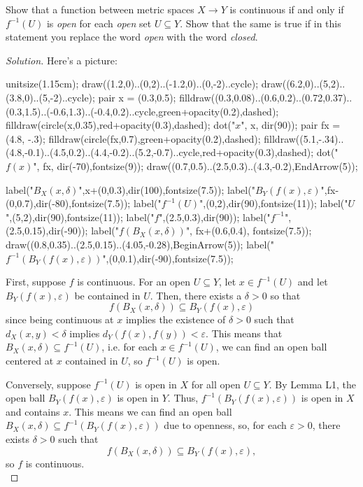 \documentclass[11pt]{scrartcl}
\providecommand{\eps}{\varepsilon}
\providecommand{\inv}{^{-1}}
\newenvironment{soln}{\begin{proof}[Solution]}{\end{proof}}
\begin{document}
\begin{problem}
	Show that a function between metric spaces $X\to Y$ is continuous
	if and only if $f\inv (U)$ is \emph{open}
	for each \emph{open} set $U\subseteq Y$.
	Show that the same is true if in this statement
	you replace the word \emph{open} with the word \emph{closed}.
\end{problem}

\begin{soln}
	Here's a picture:
	\begin{center}
		\begin{asy}
			unitsize(1.15cm);
			draw((1.2,0)..(0,2)..(-1.2,0)..(0,-2)..cycle);
			draw((6.2,0)..(5,2)..(3.8,0)..(5,-2)..cycle);
			pair x = (0.3,0.5);
			filldraw((0.3,0.08)..(0.6,0.2)..(0.72,0.37)..(0.3,1.5)..(-0.6,1.3)..(-0.4,0.2)..cycle,green+opacity(0.2),dashed);
			filldraw(circle(x,0.35),red+opacity(0.3),dashed);
			dot("$x$", x, dir(90));
			pair fx = (4.8, -.3);
			filldraw(circle(fx,0.7),green+opacity(0.2),dashed);
			filldraw((5.1,-.34)..(4.8,-0.1)..(4.5,0.2)..(4.4,-0.2)..(5.2,-0.7)..cycle,red+opacity(0.3),dashed);
			dot("$f(x)$", fx, dir(-70),fontsize(9));
			draw((0.7,0.5)..(2.5,0.3)..(4.3,-0.2),EndArrow(5));
			
			label("$B_X(x,\delta)$",x+(0,0.3),dir(100),fontsize(7.5));
			label("$B_Y(f(x),\varepsilon)$",fx-(0,0.7),dir(-80),fontsize(7.5));
			label("$f^{-1}(U)$",(0,2),dir(90),fontsize(11));
			label("$U$",(5,2),dir(90),fontsize(11));
			label("$f$",(2.5,0.3),dir(90));
			label("$f^{-1}$",(2.5,0.15),dir(-90));
			label("$f(B_X(x,\delta))$", fx+(0.6,0.4), fontsize(7.5));
			draw((0.8,0.35)..(2.5,0.15)..(4.05,-0.28),BeginArrow(5));
			label("$f^{-1}(B_Y(f(x),\varepsilon))$",(0,0.1),dir(-90),fontsize(7.5));
		\end{asy}
	\end{center}
	
	First, suppose $f$ is continuous.
	For an open $U\subseteq Y$, let $x\in f\inv(U)$
	and let $B_Y(f(x),\eps)$ be contained in $U$.
	Then, there exists a $\delta > 0$ so that
	\[f(B_X(x,\delta))\subseteq B_Y(f(x),\eps)\]
	since being continuous at $x$ implies the existence of $\delta> 0$
	such that $d_X(x, y) < \delta$ implies $d_Y(f(x), f(y)) < \eps$.
	This means that $B_X(x,\delta)\subseteq f\inv(U)$, i.e.
	for each $x\in f\inv(U)$, we can find an open ball centered at $x$
	contained in $U$, so $f\inv(U)$ is open.
	
	Conversely, suppose $f\inv(U)$ is open in $X$ for all open $U\subseteq Y$.
	By Lemma L1, the open ball $B_Y(f(x),\eps)$ is open in $Y$.
	Thus, $f\inv(B_Y(f(x),\eps))$ is open in $X$ and contains $x$.
	This means we can find an open ball
	$B_X(x,\delta)\subseteq f\inv(B_Y(f(x),\eps))$ due to openness,
	so, for each $\eps>0$, there exists $\delta>0$ such that
	\[f(B_X(x,\delta))\subseteq B_Y(f(x),\eps),\]
	so $f$ is continuous.\\
	

\end{soln}
\end{document}

